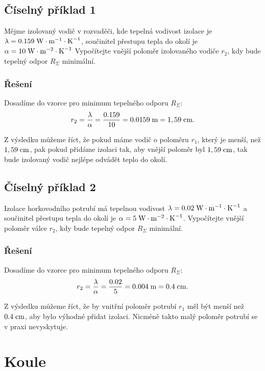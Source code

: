 \documentclass{article}
\begin{document}
\subsection{Číselný příklad 1}
Mějme izolovaný vodič v rozvaděči, kde tepelná vodivost izolace je $\lambda = 0.159 \; \textrm{W} \cdot \textrm{m}^{-1} \cdot \textrm{K}^{-1}$, součinitel přestupu tepla do okolí je $\alpha = 10 \; \textrm{W} \cdot \textrm{m}^{-2} \cdot \textrm{K}^{-1}$ Vypočítejte vnější poloměr izolovaného vodiče $r_2$, kdy bude tepelný odpor $R_\Sigma$ minimální.


\subsubsection{Řešení}
Dosadíme do vzorce pro minimum tepelného odporu $R_\Sigma$:
$$
    r_2 = \frac{\lambda}{\alpha} = \frac{0.159}{10} = 0.0159 \; \textrm{m} = 1,59 \; \textrm{cm}.
$$

Z výsledku můžeme říct, že pokud máme vodič o poloměru $r_1$, který je menší, než $1,59 \; \textrm{cm}$, pak pokud přidáme izolaci tak, aby vnější poloměr byl $1,59 \; \textrm{cm}$, tak bude izolovaný vodič nejlépe odvádět teplo do okolí.



\subsection{Číselný příklad 2}
Izolace horkovodního potrubí má tepelnou vodivost $\lambda = 0.02 \; \textrm{W} \cdot \textrm{m}^{-1} \cdot \textrm{K}^{-1}$ a součinitel přestupu tepla do okolí je $\alpha = 5 \; \textrm{W} \cdot \textrm{m}^{-2} \cdot \textrm{K}^{-1}$. Vypočítejte vnější poloměr válce $r_2$, kdy bude tepelný odpor $R_\Sigma$ minimální.


\subsubsection{Řešení}
Dosadíme do vzorce pro minimum tepelného odporu $R_\Sigma$:
$$
    r_2 = \frac{\lambda}{\alpha} = \frac{0.02}{5} = 0.004 \; \textrm{m} = 0.4 \; \textrm{cm}.
$$

Z výsledku můžeme říct, že by vnitřní poloměr potrubí $r_1$ měl být menší než $0.4 \; \textrm{cm}$, aby bylo výhodné přidat izolaci. Nicméně takto malý poloměr potrubí se v praxi nevyskytuje.

\newpage




\section{ Koule \spicy \spicy \spicy}
\end{document}
